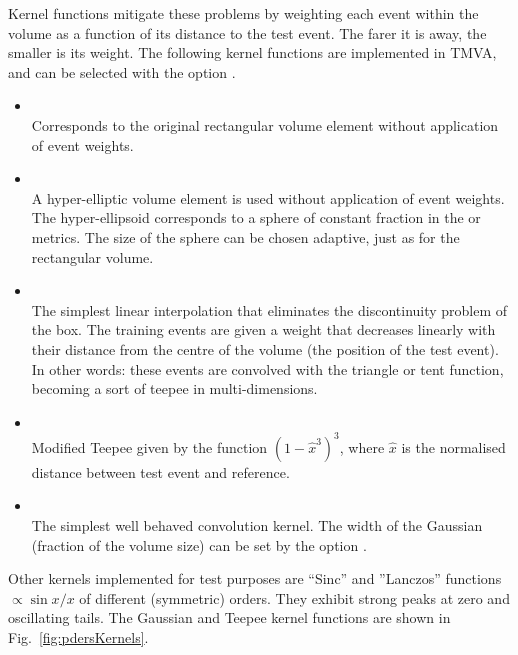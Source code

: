 Kernel functions mitigate these problems by weighting each event within
the volume as a function of its distance to the test event. The 
farer it is away, the smaller is its weight. The following kernel functions are
implemented in TMVA, and can be selected with the option .
\begin{itemize}

\item	{} \\
		Corresponds to the original rectangular volume element 
		without application of event weights.

\item {} \\
		A hyper-elliptic volume element is used
		without application of event weights. The hyper-ellipsoid corresponds 
		to a sphere of constant fraction in the  or 
		metrics. The size of the sphere can be chosen adaptive, just as 
		for the rectangular volume.

\item	{} \\
		The simplest linear interpolation that eliminates the discontinuity 
      problem of the box. The training events are 
      given a weight that decreases linearly with their distance
      from the centre of the volume (the position of the test event).
		In other words: these events are convolved with the triangle 
      or tent function, becoming a sort of teepee in multi-dimensions.

\item {} \\ 
      Modified Teepee given by the function $(1-\hat x^3)^3$, where $\hat x$
      is the normalised distance between test event and reference. 

\item {} \\ 
		The simplest well behaved convolution kernel.
		The width of the Gaussian (fraction of the volume size) can be 
		set by the option .

\end{itemize}
Other kernels implemented for test purposes are ``Sinc'' and 
''Lanczos'' functions $\propto \sin x/x$ of different (symmetric) orders.
They exhibit strong peaks at zero and oscillating tails. The Gaussian and 
Teepee kernel functions are shown in Fig.~\ref{fig:pdersKernels}.

